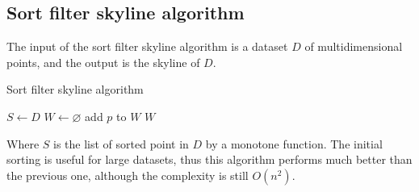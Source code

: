 \documentclass[12pt, a4paper]{report}
\newtheorem[style=M,bodystyle=\normalfont]{theorem}{Theorem}
\newtheorem[style=M,bodystyle=\normalfont]{corollary}{Corollary}
\newtheorem[style=M,bodystyle=\normalfont]{lemma}{Lemma}
\newtheorem[style=M,bodystyle=\normalfont]{definition}{Definition}
\begin{document}
    \subsection{Sort filter skyline algorithm}
    The input of the sort filter skyline algorithm is a dataset $D$ of multidimensional points, and the output is the skyline of $D$.
    \begin{algorithm}[H]
        \caption{Sort filter skyline algorithm}
            \begin{algorithmic}[1]
                \State $S \leftarrow D$
                \State $W \leftarrow \varnothing$
                        \State add $p$ to $W$
                    \EndIf
                \EndFor
                \State \Return $W$
            \end{algorithmic}
    \end{algorithm}
    Where $S$ is the list of sorted point in $D$ by a monotone function. The initial sorting is useful for large datasets, thus this algorithm performs much better than the
    previous one, although the complexity is still $O(n^2)$. 
\end{document}
